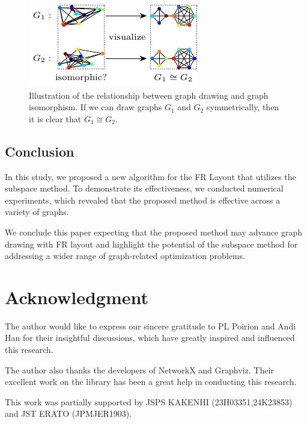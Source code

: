 \documentclass[dvipdfmx,journal]{IEEEtran}
\begin{document}
\begin{figure}[t]
  \centering
  \includegraphics[width=\columnwidth]{iso/iso.pdf}
  \caption{
    Illustration of the relationship between graph drawing and graph isomorphism.
    If we can draw graphs $G_1$ and $G_2$ symmetrically, then it is clear that $G_1 \cong G_2$.
  }
  \label{fig:iso}
\end{figure}

\subsection{Conclusion} \label{sec:conclusion}

In this study, we proposed a new algorithm for the FR Layout that utilizes the subspace method.
To demonstrate its effectiveness, we conducted numerical experiments, which revealed that the proposed method is effective across a variety of graphs.

We conclude this paper expecting that the proposed method may advance graph drawing with FR layout and highlight the potential of the subspace method for addressing a wider range of graph-related optimization problems.

\section{Acknowledgment}

The author would like to express our sincere gratitude to PL Poirion and Andi Han for their insightful discussions, which have greatly inspired and influenced this research.

The author also thanks the developers of NetworkX and Graphviz. Their excellent work on the library has been a great help in conducting this research.

This work was partially supported by JSPS KAKENHI (23H03351,24K23853) and JST ERATO (JPMJER1903).
\end{document}
